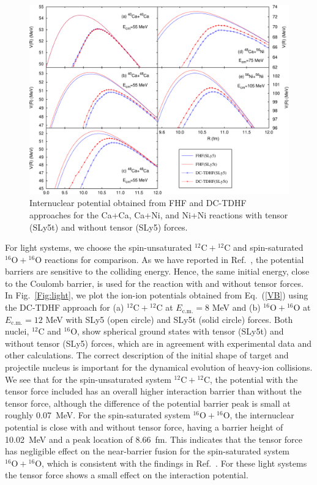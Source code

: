 \begin{figure}
	\includegraphics[width=\textwidth]{../Figures/TensorPot/V3_ppt.pdf}
	\caption{Internuclear potential obtained from FHF and DC-TDHF approaches for the Ca+Ca, Ca+Ni, and Ni+Ni reactions
		with tensor (SLy5t) and without tensor (SLy5) forces.
		\label{Fig:medium}}
\end{figure}

For light systems, we choose the spin-unsaturated $^{12}\mathrm{C}+\mathrm{^{12}C}$ and spin-saturated $^{16}\mathrm{O}+\mathrm{^{16}O}$ reactions
for comparison. As we have reported in Ref.~\citep{Umar2014_PRC89-034611}, the potential barriers are sensitive to the
colliding energy. Hence, the same initial energy, close to the Coulomb barrier, is used for the reaction with and without tensor forces.
In Fig.~\ref{Fig:light}, we plot the ion-ion potentials obtained from Eq.~(\ref{VB}) using the DC-TDHF approach for (a) $^{12}\mathrm{C}+\mathrm{^{12}C}$
at $E_{\mathrm{c.m.}}=8$ MeV  and (b) $^{16}\mathrm{O}+\mathrm{^{16}O}$ at $E_{\mathrm{c.m.}}=12$ MeV with SLy5 (open circle) and SLy5t (solid circle) forces.
Both nuclei, $^{12}\mathrm{C}$ and $\mathrm{^{16}O}$, show spherical ground states with tensor (SLy5t) and without tensor (SLy5) forces, which
are in agreement with experimental data and other calculations. The correct description of the initial shape of
target and projectile nucleus is important for the dynamical evolution of heavy-ion collisions.
We see that for the spin-unsaturated system $^{12}\mathrm{C}+\mathrm{^{12}C}$, the potential with the tensor force included has an overall higher
interaction barrier than without the tensor force, although the difference of the potential barrier peak is small at roughly 0.07~MeV.
For the spin-saturated system $^{16}\mathrm{O}+\mathrm{^{16}O}$, the internuclear potential is close with and without tensor force,
having a barrier height of 10.02~MeV and a peak location of 8.66~fm. This indicates that the tensor force has negligible effect on the near-barrier fusion
for the spin-saturated system $^{16}\mathrm{O}+\mathrm{^{16}O}$, which is consistent with the findings in Ref.~\citep{Stevenson2016_PRC93-054617}.
For these light systems the tensor force shows a small effect on the interaction potential.



